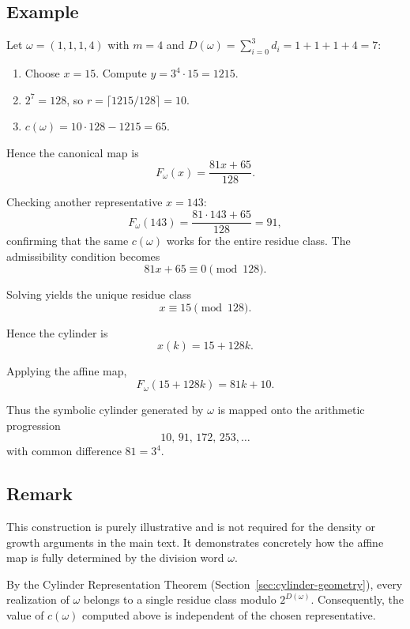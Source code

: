 \documentclass[12pt, oneside]{article}
\numberwithin{equation}{section}
\theoremstyle{definition}
\theoremstyle{plain}
\theoremstyle{remark}
\begin{document}
\newpage
\subsection{Example}

Let \(\omega = (1,1,1,4)\) with \(m=4\) and \(D(\omega) = \sum_{i=0}^{3} d_i = 1 + 1 + 1 + 4 = 7\):

\begin{enumerate}
\item Choose \(x = 15\). Compute \(y = 3^4 \cdot 15 = 1215\).  
\item \(2^7 = 128\), so \(r = \lceil 1215/128 \rceil = 10\).  
\item \(c(\omega) = 10 \cdot 128 - 1215 = 65\).  
\end{enumerate}

Hence the canonical map is
\[
F_\omega(x) = \frac{81x + 65}{128}.
\]

Checking another representative \(x = 143\):
\[
F_\omega(143) = \frac{81 \cdot 143 + 65}{128} = 91,
\]
confirming that the same \(c(\omega)\) works for the entire residue class.
The admissibility condition becomes
\[
81x+65\equiv0\pmod{128}.
\]

Solving yields the unique residue class
\[
x\equiv15\pmod{128}.
\]

Hence the cylinder is
\[
x(k)=15+128k.
\]

Applying the affine map,
\[
F_\omega(15+128k)
=
81k+10.
\]

Thus the symbolic cylinder generated by \(\omega\) is mapped onto the
arithmetic progression
\[
10,\,91,\,172,\,253,\dots
\]
with common difference \(81=3^4\).

\subsection*{Remark}

This construction is purely illustrative and is not required for the density
or growth arguments in the main text. It demonstrates concretely how the affine
map is fully determined by the division word \(\omega\).

By the Cylinder Representation Theorem (Section~\ref{sec:cylinder-geometry}), every
realization of \(\omega\) belongs to a single residue class modulo \(2^{D(\omega)}\).
Consequently, the value of \(c(\omega)\) computed above is independent of the chosen
representative.
\end{document}
